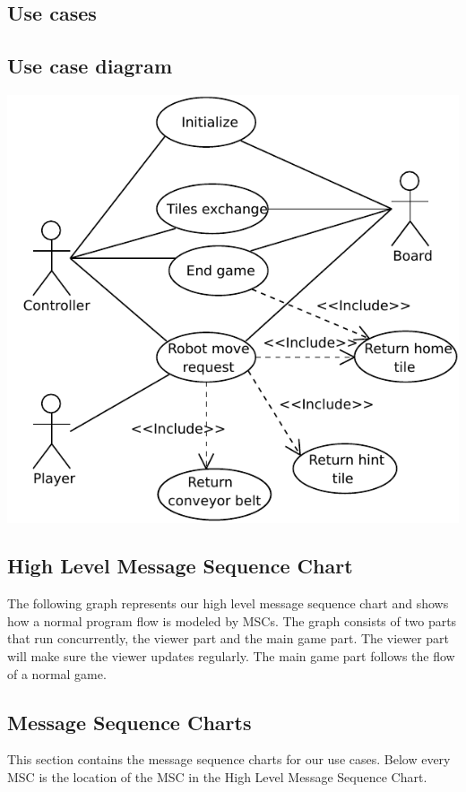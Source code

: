 \subsection{Use cases}
	
\subsection{Use case diagram}
	\includegraphics[width=\linewidth]{usecases/diagram.pdf}	

\subsection{High Level Message Sequence Chart}
	The following graph represents our high level message sequence chart and shows how a normal program flow is modeled by MSCs. The graph consists of two parts that run concurrently, the viewer part and the main game part. The viewer part will make sure the viewer updates regularly. The main game part follows the flow of a normal game. 
	
	
	
\subsection{Message Sequence Charts}
	This section contains the message sequence charts for our use cases. Below every MSC is the location of the MSC in the High Level Message Sequence Chart.

